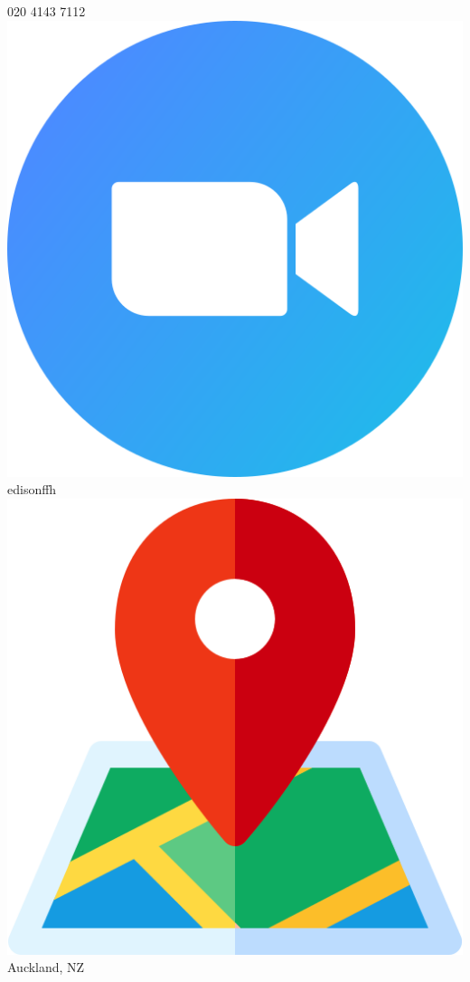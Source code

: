 \begin{center}
    020 4143 7112
    \hspace*{5mm}
    \includegraphics[scale=0.036]{figs/zoom.png}
    edisonffh
    \hspace*{5mm}
    \includegraphics[scale=0.03]{figs/map.png}
    Auckland, NZ
\end{center}
